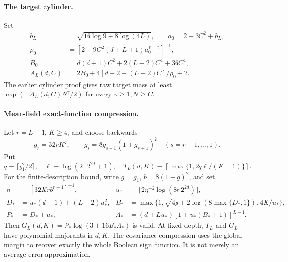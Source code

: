 \documentclass[11pt]{article}
\theoremstyle{remark}\newtheorem{remark}[theorem]{Remark}
\begin{document}
\paragraph{The target cylinder.}
Set
\begin{align*}
 b_L&=\sqrt{16\log9+8\log(4L)},\qquad a_0=2+3C^2+b_L,\\
 \rho_0&=[2+9C^2(d+L+1)a_0^{L-2}]^{-1},\\
 B_0&=d(d+1)C^2+2(L-2)C^4+36C^4,\\
 A_L(d,C)&=2B_0+4[d+2+(L-2)C]/\rho_0+2.
\end{align*}
The earlier cylinder proof gives raw target mass at least
$\exp(-A_L(d,C)N^\gamma/2)$ for every $\gamma\ge1,N\ge C$.

\paragraph{Mean-field exact-function compression.}
Let $r=L-1$, $K\ge4$, and choose backwards
\[
 g_r=32rK^2,\qquad
 g_s=8g_{s+1}(1+g_{s+1})^2\quad(s=r-1,\ldots,1).
\]
Put
\[
 q=\lceil g_1^2/2\rceil,\quad
 \ell=\log(2\cdot2^{2d}+1),\quad
 T_L(d,K)=\left\lceil\max\{1,2q\ell/(K-1)\}\right\rceil.
\]
For the finite-description bound, write $g=g_1$, $b=8(1+g)^2$, and set
\begin{align*}
 \eta&=[32Kr b^{r-1}]^{-1},&
 u_*&=\lceil2\eta^{-2}\log(8r\,2^{2d})\rceil,\\
 D_*&=u_*(d+1)+(L-2)u_*^2,&
 B_*&=\max\{1,\sqrt{4g+2\log(8\max\{D_*,1\})},4K/u_*\},\\
 P_*&=D_*+u_*,&
 \Lambda_*&=(d+Lu_*)[1+u_*(B_*+1)]^{L-1}.
\end{align*}
Then $G_L(d,K)=P_*\log(3+16B_*\Lambda_*)$ is valid. At fixed depth,
$T_L$ and $G_L$ have polynomial majorants in $d,K$. The covariance
compression uses the global margin to recover exactly the whole Boolean
sign function. It is not merely an average-error approximation.
\end{document}
